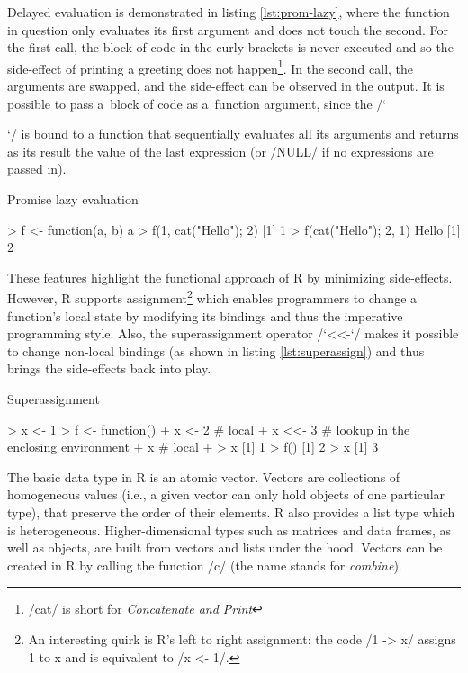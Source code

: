 Delayed evaluation is demonstrated in listing \ref{lst:prom-lazy}, where the function in question only evaluates its first argument and does not touch the second. For the first call, the block of code in the curly brackets is never executed and so the side-effect of printing a greeting does not happen\footnote{\rinline/cat/ is short for \emph{Concatenate and Print}}. In the second call, the arguments are swapped, and the side-effect can be observed in the output. It is possible to pass a~block of code as a~function argument, since the \rinline/`{`/ is bound to a function that sequentially evaluates all its arguments and returns as its result the value of the last expression (or \rinline/NULL/ if no expressions are passed in).

\begin{listing}[htbp]
  \caption{\label{lst:prom-lazy}Promise lazy evaluation}
  \begin{rcode}
> f <- function(a, b) a
> f(1, {cat("Hello\n"); 2})
[1] 1
> f({cat("Hello\n"); 2}, 1)
Hello
[1] 2
  \end{rcode}
\end{listing}

These features highlight the functional approach of R by minimizing side-effects. However, R supports assignment\footnote{An interesting quirk is R's left to right assignment: the code \rinline/1 -> x/ assigns 1 to x and is equivalent to \rinline/x <- 1/.} which enables programmers to change a function's local state by modifying its bindings and thus the imperative programming style. Also, the superassignment operator \rinline/`<<-`/ makes it possible to change non-local bindings (as shown in listing \ref{lst:superassign}) and thus brings the side-effects back into play.

\begin{listing}[htbp]
  \caption{\label{lst:superassign}Superassignment}
  \begin{rcode}
> x <- 1
> f <- function() {
+     x <- 2  # local
+     x <<- 3  # lookup in the enclosing environment
+     x  # local
+ }
> x
[1] 1
> f()
[1] 2
> x
[1] 3
  \end{rcode}
\end{listing}

The basic data type in R is an atomic vector. Vectors are collections of homogeneous values (i.e., a given vector can only hold objects of one particular type), that preserve the order of their elements. R also provides a list type which is heterogeneous. Higher-dimensional types such as matrices and data frames, as well as objects, are built from vectors and lists under the hood. Vectors can be created in R by calling the function \rinline/c/ (the name stands for \emph{combine}).

}
